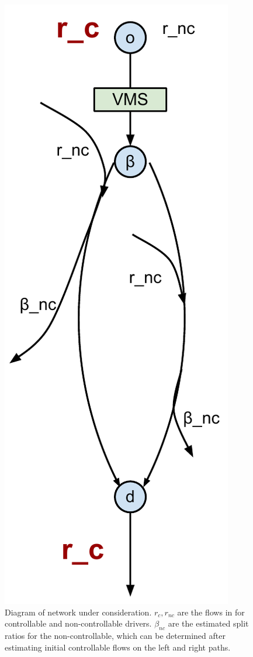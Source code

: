 \begin{figure}
\begin{centering}
\includegraphics[scale=0.4]{NetworkForCMS}
\par\end{centering}

\caption{Diagram of network under consideration\label{fig:Diagram-of-network}. $r_c, r_{nc}$ are the flows in for controllable and non-controllable drivers. $\beta_{nc}$ are the estimated split ratios for the non-controllable, which can be determined after estimating initial controllable flows on the left and right paths.}
\end{figure}


